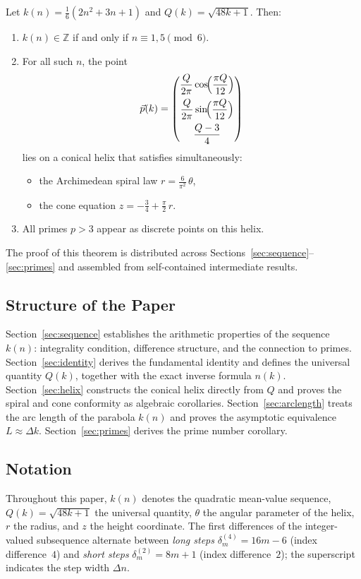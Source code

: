 \begin{theorem}\label{thm:main}
Let $k(n) = \frac{1}{6}(2n^2+3n+1)$ and $Q(k) = \sqrt{48k+1}$. Then:
\begin{enumerate}[label=\textup{(\roman*)}]
  \item $k(n) \in \mathbb{Z}$ if and only if $n \equiv 1, 5 \pmod{6}$.
  \item For all such $n$, the point
  \begin{equation}\label{eq:helix-main}
    \vec{p}(k) =
    \begin{pmatrix}
      \dfrac{Q}{2\pi}\cos\!\Bigl(\dfrac{\pi Q}{12}\Bigr)\\[8pt]
      \dfrac{Q}{2\pi}\sin\!\Bigl(\dfrac{\pi Q}{12}\Bigr)\\[8pt]
      \dfrac{Q-3}{4}
    \end{pmatrix}
  \end{equation}
  lies on a conical helix that satisfies simultaneously:
  \begin{itemize}
    \item the Archimedean spiral law $r = \frac{6}{\pi^2}\,\theta$,
    \item the cone equation $z = -\frac{3}{4} + \frac{\pi}{2}\,r$.
  \end{itemize}
  \item All primes $p > 3$ appear as discrete points on this helix.
\end{enumerate}
\end{theorem}

The proof of this theorem is distributed across
Sections~\ref{sec:sequence}--\ref{sec:primes} and assembled from
self-contained intermediate results.

\subsection{Structure of the Paper}

Section~\ref{sec:sequence} establishes the arithmetic properties of the
sequence $k(n)$: integrality condition, difference structure, and the
connection to primes.
Section~\ref{sec:identity} derives the fundamental identity and defines
the universal quantity $Q(k)$, together with the exact inverse formula
$n(k)$.
Section~\ref{sec:helix} constructs the conical helix directly from $Q$
and proves the spiral and cone conformity as algebraic corollaries.
Section~\ref{sec:arclength} treats the arc length of the parabola $k(n)$
and proves the asymptotic equivalence $L \approx \Delta k$.
Section~\ref{sec:primes} derives the prime number corollary.

\subsection{Notation}

Throughout this paper, $k(n)$ denotes the quadratic mean-value sequence,
$Q(k) = \sqrt{48k+1}$ the universal quantity, $\theta$ the angular
parameter of the helix, $r$ the radius, and $z$ the height coordinate.
The first differences of the integer-valued subsequence alternate between
\emph{long steps} $\delta^{(4)}_m = 16m-6$ (index difference~$4$) and
\emph{short steps} $\delta^{(2)}_m = 8m+1$ (index difference~$2$); the
superscript indicates the step width $\Delta n$.
